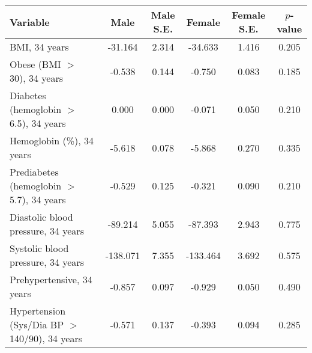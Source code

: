 \begin{tabular}{l c c c c c}
\toprule
\textbf{Variable} & \textbf{Male} & \textbf{Male S.E.}  & \textbf{Female} & \textbf{Female S.E.} & \textbf{$ p $-value} \\
\midrule
BMI, 34 years & -31.164 & 2.314 &  -34.633 & 1.416 & 0.205 \\
Obese (BMI $ > $ 30), 34 years & -0.538 & 0.144 &  -0.750 & 0.083 & 0.185 \\
Diabetes (hemoglobin $ > $ 6.5), 34 years & 0.000 & 0.000 &  -0.071 & 0.050 & 0.210 \\
Hemoglobin (\%), 34 years & -5.618 & 0.078 &  -5.868 & 0.270 & 0.335 \\
Prediabetes (hemoglobin $ > $ 5.7), 34 years & -0.529 & 0.125 &  -0.321 & 0.090 & 0.210 \\
Diastolic blood pressure, 34 years & -89.214 & 5.055 &  -87.393 & 2.943 & 0.775 \\
Systolic blood pressure, 34 years & -138.071 & 7.355 &  -133.464 & 3.692 & 0.575 \\
Prehypertensive, 34 years & -0.857 & 0.097 &  -0.929 & 0.050 & 0.490 \\
Hypertension (Sys/Dia BP $ > $ 140/90), 34 years & -0.571 & 0.137 &  -0.393 & 0.094 & 0.285 \\
\bottomrule
\end{tabular}
